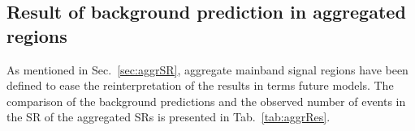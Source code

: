 \subsection{Result of background prediction in aggregated regions}
\label{sec:AggrRes}
As mentioned in Sec.~\ref{sec:aggrSR}, 
 aggregate mainband signal regions have been defined to ease the reinterpretation of the results in terms future models.
 The comparison of the background predictions and the observed number of events in the SR of the aggregated SRs is presented in Tab.~\ref{tab:aggrRes}.
\begin{table}[!h]
\centering
\caption[The results of background estimation in aggregated regions.]{Numbers of expected background events with combined statistical
and systematic uncertainty and the observed numbers
of events in aggregated SRs. The expected number of signal
events for the two corresponding benchmark signals are given as well.}
\label{tab:aggrRes}
\end{table}
\newpage
\newpage
\newpage
\newpage
\newpage
